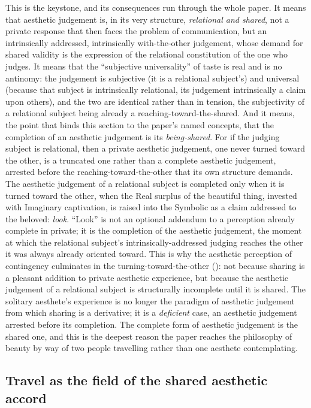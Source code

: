 This is the keystone, and its consequences run through the whole paper. It means that aesthetic judgement is, in its very structure, \emph{relational and shared}, not a private response that then faces the problem of communication, but an intrinsically addressed, intrinsically with-the-other judgement, whose demand for shared validity is the expression of the relational constitution of the one who judges. It means that the ``subjective universality'' of taste is real and is no antinomy: the judgement is subjective (it is a relational subject's) and universal (because that subject is intrinsically relational, its judgement intrinsically a claim upon others), and the two are identical rather than in tension, the subjectivity of a relational subject being already a reaching-toward-the-shared. And it means, the point that binds this section to the paper's named concepts, that the completion of an aesthetic judgement is its \emph{being-shared}. For if the judging subject is relational, then a private aesthetic judgement, one never turned toward the other, is a truncated one rather than a complete aesthetic judgement, arrested before the reaching-toward-the-other that its own structure demands. The aesthetic judgement of a relational subject is completed only when it is turned toward the other, when the Real surplus of the beautiful thing, invested with Imaginary captivation, is raised into the Symbolic as a claim addressed to the beloved: \emph{look}. ``Look'' is not an optional addendum to a perception already complete in private; it is the completion of the aesthetic judgement, the moment at which the relational subject's intrinsically-addressed judging reaches the other it was always already oriented toward. This is why the aesthetic perception of contingency culminates in the turning-toward-the-other (): not because sharing is a pleasant addition to private aesthetic experience, but because the aesthetic judgement of a relational subject is structurally incomplete until it is shared. The solitary aesthete's experience is no longer the paradigm of aesthetic judgement from which sharing is a derivative; it is a \emph{deficient} case, an aesthetic judgement arrested before its completion. The complete form of aesthetic judgement is the shared one, and this is the deepest reason the paper reaches the philosophy of beauty by way of two people travelling rather than one aesthete contemplating.

\subsection{Travel as the field of the shared aesthetic accord}
\label{p21:sub:ap-travelaccord}

